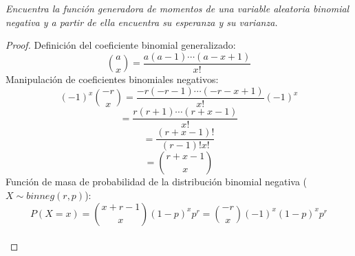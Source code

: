 \documentclass[11pt]{article}
\begin{document}
\begin{tcolorbox}[title = \textcolor{black}{\textcolor{white}{Problema 3}}]
\textit{Encuentra la funci\'on generadora de momentos de una variable aleatoria binomial negativa y a partir de ella encuentra su esperanza y su varianza.
}
\end{tcolorbox}
\begin{proof}
Definición del coeficiente binomial generalizado:
\[
\binom{a}{x} = \frac{a(a-1)\cdots(a - x + 1)}{x!}
\]
Manipulación de coeficientes binomiales negativos:
\[
(-1)^x \binom{-r}{x} = \frac{-r(-r - 1)\cdots(-r - x + 1)}{x!}(-1)^x
\]
\[
= \frac{r(r + 1)\cdots(r + x - 1)}{x!}
\]
\[
= \frac{(r + x - 1)!}{(r - 1)!x!}
\]
\[
= \binom{r + x - 1}{x}
\]
Función de masa de probabilidad de la distribución binomial negativa ($X\sim bin neg(r,p)$):
\[
P(X = x) = \binom{x + r - 1}{x}(1 - p)^x p^r = \binom{-r}{x}(-1)^x(1 - p)^x p^r
\]\,\\


\end{proof}
\end{document}
